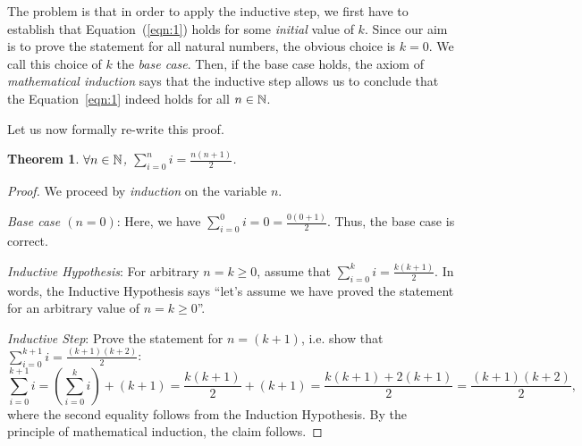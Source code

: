 \documentclass[11pt]{article}
\newcounter{thm}
\newtheorem{theorem}{Theorem}[thm]
\begin{document}
The problem is that in order to apply the inductive step, we first have to establish that Equation~(\ref{eqn:1}) holds for some \emph{initial} value of $k$. Since our aim is to prove the statement for all natural numbers, the obvious choice is $k=0$. We call this choice of $k$ the \emph{base case}. Then, if the base case holds, the axiom of \emph{mathematical induction} says that the inductive step allows us to conclude that the Equation~{\ref{eqn:1}} indeed holds for all $n\in\mathbb{N}$.

Let us now formally re-write this proof.
\begin{theorem}
    $\forall n \in \mathbb{N}$, $\displaystyle\sum_{i=0}^n i = \frac{n(n+1)}{2}$.
\end{theorem}
\begin{proof}
We proceed by \emph{induction} on the variable $n$.

\emph{Base case $(n=0)$}: Here, we have $\displaystyle\sum_{i=0}^0 i = 0 = \frac{0(0+1)}{2}$. Thus, the base case is correct.

\emph{Inductive Hypothesis}: For arbitrary $n=k\geq 0$, assume that $\sum_{i=0}^k i = \frac{k(k+1)}{2}$. In words, the Inductive Hypothesis says ``let's assume we have proved the statement for an arbitrary value of $n =k \geq 0$''.

\emph{Inductive Step}: Prove the statement for $n=(k+1)$, i.e. show that $\sum_{i=0}^{k+1} i = \frac{(k+1)(k+2)}{2}$:
\begin{equation}\label{eqn:2}
\displaystyle\sum_{i=0}^{k+1} i = \left(\sum_{i=0}^{k} i\right) + (k+1)
= \frac{k(k+1)}{2} + (k+1)
= \frac{k(k+1)+ 2(k+1)}{2}
= \frac{(k+1)(k+2)}{2},
\end{equation}
where the second equality follows from the Induction Hypothesis. By the principle of mathematical induction, the claim follows.
\end{proof}

\end{document}

